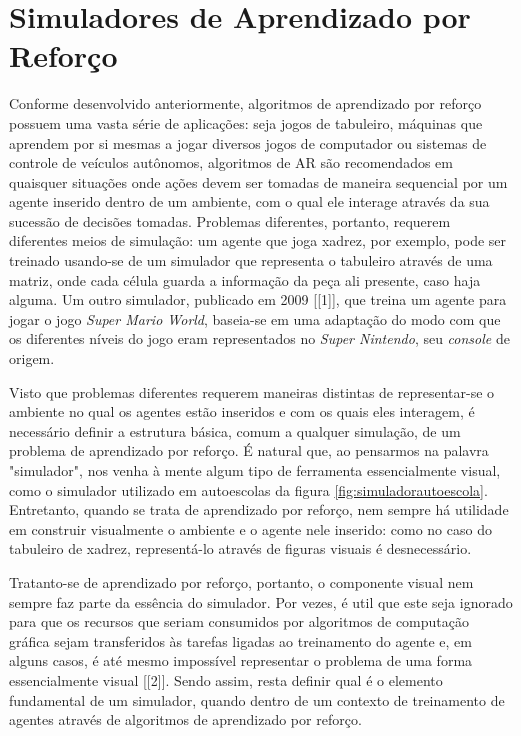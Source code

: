 \documentclass[cic,tc]{iiufrgs}
\begin{document}
\section{Simuladores de Aprendizado por Reforço}



Conforme desenvolvido anteriormente, algoritmos de aprendizado por reforço
possuem uma vasta série de aplicações: seja jogos de tabuleiro, máquinas que
aprendem por si mesmas a jogar diversos jogos de computador ou sistemas de
controle de veículos autônomos, algoritmos de AR são recomendados em quaisquer
situações onde ações devem ser tomadas de maneira sequencial por um agente
inserido dentro de um ambiente, com o qual ele interage através da sua sucessão
de decisões tomadas. Problemas diferentes, portanto, requerem diferentes meios
de simulação: um agente que joga xadrez, por exemplo, pode ser treinado
usando-se de um simulador que representa o tabuleiro através de uma matriz, onde
cada célula guarda a informação da peça ali presente, caso haja alguma. Um outro
simulador, publicado em 2009 [[1]], que treina um agente para jogar o jogo
\textit{Super Mario World}, baseia-se em uma adaptação do modo com que os
diferentes níveis do jogo eram representados no \textit{Super Nintendo}, seu
\textit{console} de origem.


Visto que problemas diferentes requerem maneiras distintas de representar-se o
ambiente no qual os agentes estão inseridos e com os quais eles interagem, é
necessário definir a estrutura básica, comum a qualquer simulação, de um
problema de aprendizado por reforço. É natural que, ao pensarmos na palavra
"simulador", nos venha à mente algum tipo de ferramenta essencialmente visual,
como o simulador utilizado em autoescolas da figura
\ref{fig:simuladorautoescola}. Entretanto, quando se trata de aprendizado por
reforço, nem sempre há utilidade em construir visualmente o ambiente e o agente
nele inserido: como no caso do tabuleiro de xadrez, representá-lo através de
figuras visuais é desnecessário.


Tratanto-se de aprendizado por reforço, portanto, o componente visual nem sempre
faz parte da essência do simulador. Por vezes, é util que este seja ignorado
para que os recursos que seriam consumidos por algoritmos de computação gráfica
sejam transferidos às tarefas ligadas ao treinamento do agente e, em alguns
casos, é até mesmo impossível representar o problema de uma forma essencialmente
visual [[2]]. Sendo assim, resta definir qual é o elemento fundamental de um
simulador, quando dentro de um contexto de treinamento de agentes através de
algoritmos de aprendizado por reforço.
\end{document}
